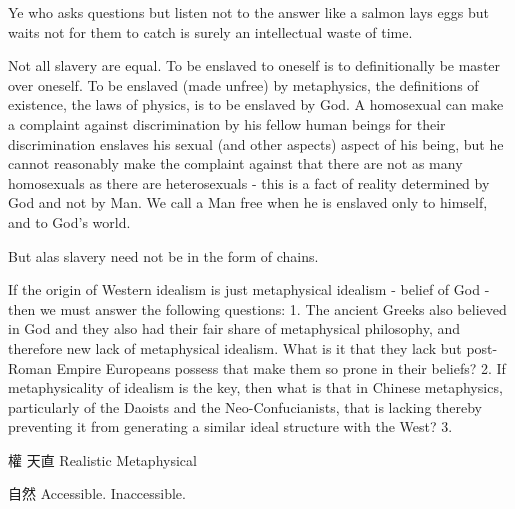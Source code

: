 Ye who asks questions but listen not to the answer like a salmon lays eggs but waits not for them to catch is surely an intellectual waste of time. 

Not all slavery are equal. To be enslaved to oneself is to definitionally be master over oneself. To be enslaved (made unfree) by metaphysics, the definitions of existence, the laws of physics, is to be enslaved by God. A homosexual can make a complaint against discrimination by his fellow human beings for their discrimination enslaves his sexual (and other aspects) aspect of his being, but he cannot reasonably make the complaint against that there are not as many homosexuals as there are heterosexuals - this is a fact of reality determined by God and not by Man. We call a Man free when he is enslaved only to himself, and to God's world. 




But alas slavery need not be in the form of chains. 



If the origin of Western idealism is just metaphysical idealism - belief of God - then we must answer the following questions: 
1. The ancient Greeks also believed in God and they also had their fair share of metaphysical philosophy, and therefore new lack of metaphysical idealism. What is it that they lack but post-Roman Empire Europeans possess that make them so prone in their beliefs?
2. If metaphysicality of idealism is the key, then what is that in Chinese metaphysics, particularly of the Daoists and the Neo-Confucianists, that is lacking thereby preventing it from generating a similar ideal structure with the West?
3. 

權 天直
Realistic 
Metaphysical 

自然
 Accessible. Inaccessible. 
